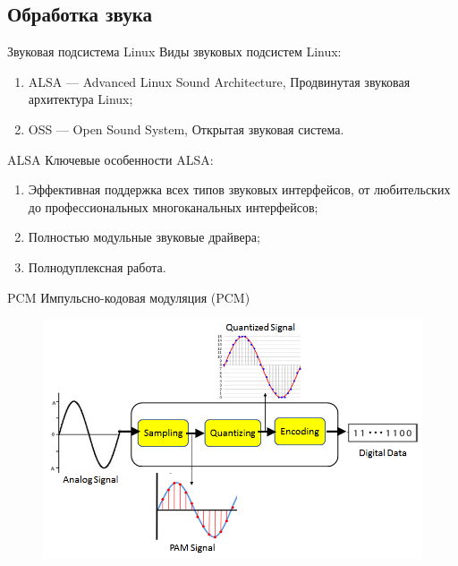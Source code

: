 \subsection{Обработка звука}

\begin{frame}{Звуковая подсистема Linux}
  Виды звуковых подсистем Linux:

  \begin{enumerate}
    \item ALSA --- Advanced Linux Sound Architecture, Продвинутая звуковая архитектура Linux;
    \item OSS --- Open Sound System, Открытая звуковая система.
  \end{enumerate}
\end{frame}

\begin{frame}{ALSA}
  Ключевые особенности ALSA:

  \begin{enumerate}
    \item Эффективная поддержка всех типов звуковых интерфейсов, от любительских до профессиональных многоканальных интерфейсов;
    \item Полностью модульные звуковые драйвера;
    \item Полнодуплексная работа.
  \end{enumerate}
\end{frame}

\begin{frame}{PCM}
  Импульсно-кодовая модуляция (PCM)

  \begin{figure}[H]
    \centering
    \includegraphics[height=0.75\textheight]{assets/images/PCM.png}
    \label{img:sound__PCM}
  \end{figure}
\end{frame}

